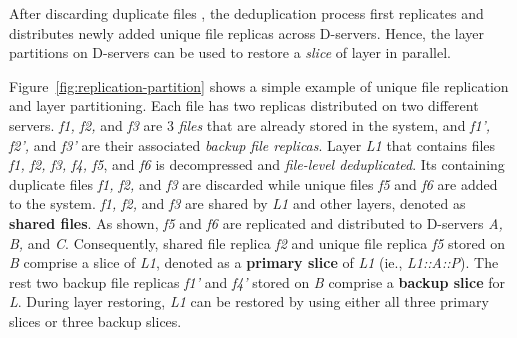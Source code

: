 
After discarding duplicate files%
, the deduplication process first replicates and distributes newly added unique file replicas across D-servers.
Hence, the layer partitions on D-servers can be used to restore a \emph{slice} of layer in parallel.

Figure~\ref{fig:replication-partition} shows a simple 
example of unique file replication and layer partitioning.
Each file has two replicas distributed on two different servers.
\emph{f1, f2,} and \emph{f3} are 3 \emph{files} that are already stored in the system,
and \emph{f1', f2',} and \emph{f3'} are their associated \emph{backup file replicas}. 
Layer \emph{L1} that contains files \emph{f1, f2, f3, f4, f5}, and \emph{f6} 
is decompressed and \emph{file-level deduplicated}.
Its containing duplicate files \emph{f1, f2,} and \emph{f3} are discarded while unique files
\emph{f5} and \emph{f6} are added to the system.
 \emph{f1, f2,} and \emph{f3} are shared by \emph{L1} and other layers, denoted as \textbf{shared files}.
As shown, 
\emph{f5} and \emph{f6} are replicated and distributed to D-servers \emph{A, B,} and \emph{C}.
Consequently,
shared file replica \emph{f2} and 
unique file replica \emph{f5} stored on \emph{B} comprise a slice of \emph{L1},
denoted as a \textbf{primary slice} of \emph{L1} (ie., \emph{L1::A::P}).
The rest two backup file replicas 
\emph{f1'} and \emph{f4'} stored on \emph{B} comprise a \textbf{backup slice} for \emph{L}.
During layer restoring,
\emph{L1} can be restored by using either all three primary slices
or three backup slices.
%

